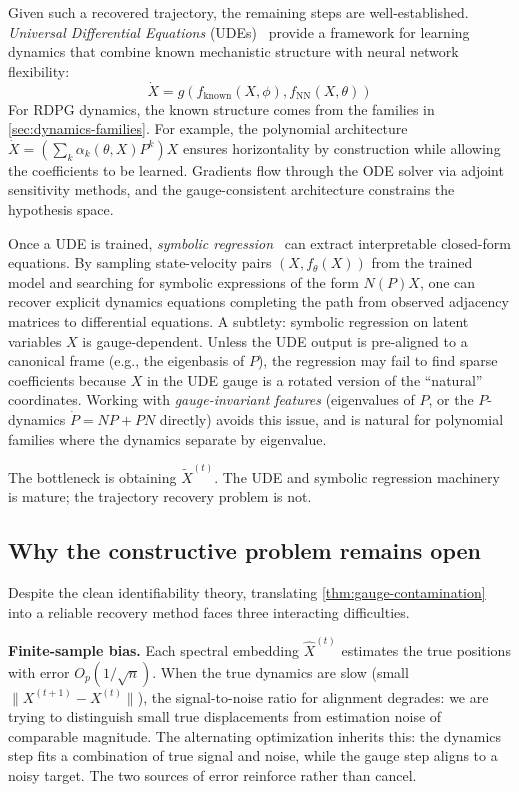 \documentclass{article}
\theoremstyle{plain}
\theoremstyle{definition}
\theoremstyle{remark}
\begin{document}
Given such a recovered trajectory, the remaining steps are well-established.
\emph{Universal Differential Equations} (UDEs)~\citep{rackauckas2020universal} provide a framework for learning dynamics that combine known mechanistic structure with neural network flexibility:
\begin{equation}
\dot{X} = g(f_{\text{known}}(X, \phi), f_{\text{NN}}(X, \theta))
\end{equation}
For RDPG dynamics, the known structure comes from the families in \cref{sec:dynamics-families}. For example, the polynomial architecture $\dot{X} = (\sum_k \alpha_k(\theta, X) P^k) X$ ensures horizontality by construction while allowing the coefficients to be learned.
Gradients flow through the ODE solver via adjoint sensitivity methods, and the gauge-consistent architecture constrains the hypothesis space.

Once a UDE is trained, \emph{symbolic regression}~\citep{symbolicregression} can extract interpretable closed-form equations.
By sampling state-velocity pairs $(X, f_\theta(X))$ from the trained model and searching for symbolic expressions of the form $N(P) X$, one can recover explicit dynamics equations completing the path from observed adjacency matrices to differential equations.
A subtlety: symbolic regression on latent variables $X$ is gauge-dependent.
Unless the UDE output is pre-aligned to a canonical frame (e.g., the eigenbasis of $P$), the regression may fail to find sparse coefficients because $X$ in the UDE gauge is a rotated version of the ``natural'' coordinates.
Working with \emph{gauge-invariant features} (eigenvalues of $P$, or the $P$-dynamics $\dot{P} = NP + PN$ directly) avoids this issue, and is natural for polynomial families where the dynamics separate by eigenvalue.

The bottleneck is obtaining $\tilde{X}^{(t)}$.
The UDE and symbolic regression machinery is mature; the trajectory recovery problem is not.


\subsection{Why the constructive problem remains open}

Despite the clean identifiability theory, translating \cref{thm:gauge-contamination} into a reliable recovery method faces three interacting difficulties.

\textbf{Finite-sample bias.}
Each spectral embedding $\hat{X}^{(t)}$ estimates the true positions with error $O_p(1/\sqrt{n})$.
When the true dynamics are slow (small $\|X^{(t+1)} - X^{(t)}\|$), the signal-to-noise ratio for alignment degrades: we are trying to distinguish small true displacements from estimation noise of comparable magnitude.
The alternating optimization inherits this: the dynamics step fits a combination of true signal and noise, while the gauge step aligns to a noisy target.
The two sources of error reinforce rather than cancel.
\end{document}
